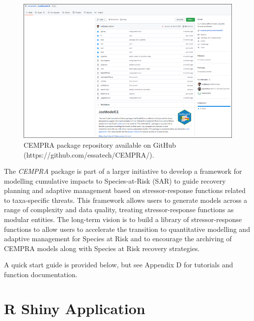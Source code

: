 \documentclass[
  letterpaper,
  DIV=11,
  numbers=noendperiod]{scrreprt}
\begin{document}
\begin{figure}

{\centering \includegraphics{images/image010.png}

}

\caption{\label{fig-figure6}CEMPRA package repository available on
GitHub (https://github.com/essatech/CEMPRA/).}

\end{figure}

The \emph{CEMPRA} package is part of a larger initiative to develop a
framework for modelling cumulative impacts to Species-at-Risk (SAR) to
guide recovery planning and adaptive management based on
stressor-response functions related to taxa-specific threats. This
framework allows users to generate models across a range of complexity
and data quality, treating stressor-response functions as modular
entities. The long-term vision is to build a library of
stressor-response functions to allow users to accelerate the transition
to quantitative modelling and adaptive management for Species at Risk
and to encourage the archiving of CEMPRA models along with Species at
Risk recovery strategies.

A quick start guide is provided below, but see Appendix D for tutorials
and function documentation.

\hypertarget{r-shiny-application-2}{%
\section{R Shiny Application}\label{r-shiny-application-2}}
\end{document}
